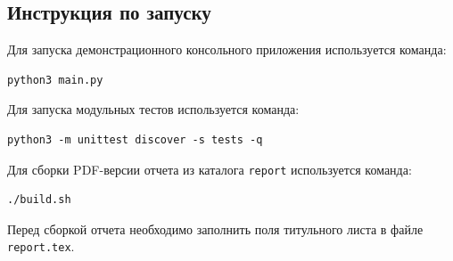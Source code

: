 \begin{appendices}
    \chapter{Инструкция по запуску}

    Для запуска демонстрационного консольного приложения используется команда:

    \begin{verbatim}
python3 main.py
    \end{verbatim}

    Для запуска модульных тестов используется команда:

    \begin{verbatim}
python3 -m unittest discover -s tests -q
    \end{verbatim}

    Для сборки PDF-версии отчета из каталога \texttt{report} используется
    команда:

    \begin{verbatim}
./build.sh
    \end{verbatim}

    Перед сборкой отчета необходимо заполнить поля титульного листа в файле
    \texttt{report.tex}.
\end{appendices}
